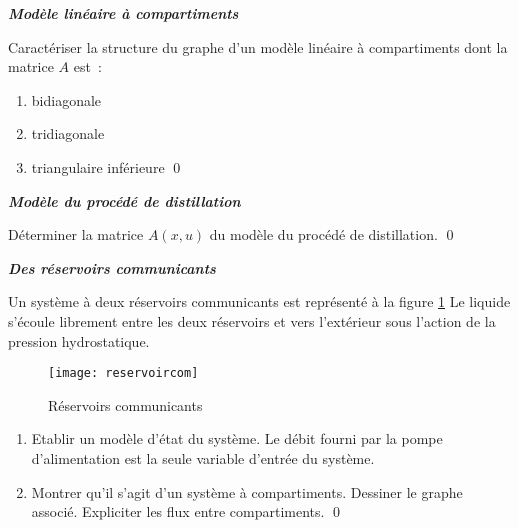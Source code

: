 \begin{exercice}{\bf \em Modèle linéaire à compartiments}

Caractériser la structure du graphe d'un modèle linéaire à
compartiments dont la matrice $A$ est~:
\begin{enumerate}
\item bidiagonale
\item tridiagonale
\item triangulaire inférieure \qed
\end{enumerate}
\end{exercice}
\vv

\begin{exercice}{\bf \em Modèle du  procédé de distillation}

Déterminer la matrice $A(x,u)$ du modèle du procédé de distillation. \qed
\end{exercice}
\vv

\begin{exercice}{\bf \em Des réservoirs communicants}

Un système à deux réservoirs communicants est représenté à la
figure \ref{Fig:reservoircom} Le liquide s'écoule librement entre les deux
réservoirs et vers l'extérieur sous l'action de la pression hydrostatique.

\begin{figure}[h]
\begin{center}
\texttt{[image: reservoircom]}
\caption{Réservoirs communicants}
\label{Fig:reservoircom}
\end{center} 
\end{figure}

\begin{enumerate}
\item Etablir un modèle d'état du système. Le débit fourni par la
pompe d'alimentation est la seule variable d'entrée du système.
\item Montrer qu'il s'agit d'un système à compartiments. Dessiner le
graphe associé. Expliciter les flux entre compartiments. \qed
\end{enumerate}
\end{exercice}



